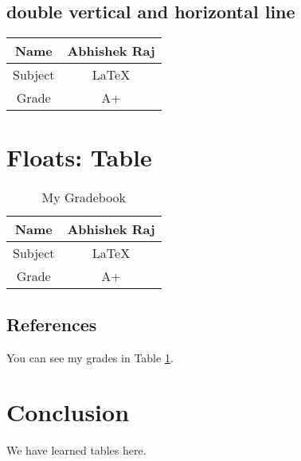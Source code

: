 \documentclass{article}
\begin{document}
	\subsection{double vertical and horizontal line}
	\begin{tabular}{|c||c|}
		\hline
		Name & Abhishek Raj \\
		\hline
		Subject & \LaTeX	\\
		\hline \hline
		Grade & A+		\\
		\hline
	\end{tabular}	
	
	\section {Floats: Table}
	
	\begin{table}[htbp]
		\caption{My Gradebook}
		
		\begin{center}
			\begin{tabular}{|c||c|}
				\hline
				Name & Abhishek Raj \\
				\hline
				Subject & \LaTeX	\\
				\hline \hline
				Grade & A+		\\
				\hline
			\end{tabular}	
		\end{center}
		\label{tab:grades}
		
	\end{table}
	
	\subsection{References}
	You can see my grades in Table \ref{tab:grades}. %
	
	\section{Conclusion}
	We have learned tables here. 
\end{document}
